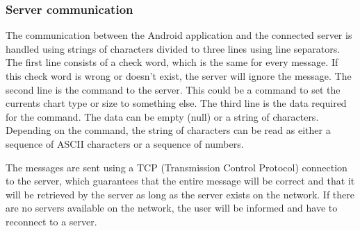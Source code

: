 \documentclass[12pt,a4paper,notitlepage]{report}
\begin{document}


\subsubsection{Server communication}
The communication between the Android application and the connected server is handled using strings of characters divided to three lines using line separators. The first line consists of a check word, which is the same for every message. If this check word is wrong or doesn't exist, the server will ignore the message. The second line is the command to the server. This could be a command to set the currents chart type or size to something else. The third line is the data required for the command. The data can be empty (null) or a string of characters. Depending on the command, the string of characters can be read as either a sequence of ASCII characters or a sequence of numbers.

The messages are sent using a TCP (Transmission Control Protocol) connection to the server, which guarantees that the entire message will be correct and that it will be retrieved by the server as long as the server exists on the network. If there are no servers available on the network, the user will be informed and have to reconnect to a server.

\end{document}
